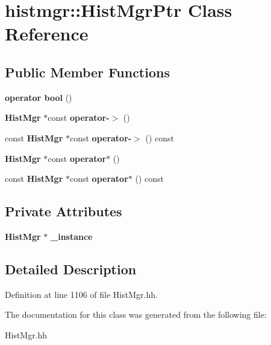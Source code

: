 \section{histmgr\-:\-:Hist\-Mgr\-Ptr Class Reference}
\label{classhistmgr_1_1HistMgrPtr}
\subsection*{Public Member Functions}
\begin{DoxyCompactItemize}
\item 
{\bfseries operator bool} ()\label{classhistmgr_1_1HistMgrPtr_acf2158fc8e0f347d006fc31f1a33bf52}

\item 
{\bf Hist\-Mgr} $\ast$const {\bfseries operator-\/$>$} ()\label{classhistmgr_1_1HistMgrPtr_a09dd0e1b7852437c12f7fe251ff713dc}

\item 
const {\bf Hist\-Mgr} $\ast$const {\bfseries operator-\/$>$} () const \label{classhistmgr_1_1HistMgrPtr_ac497929db7588d7629cd2c3bf7e9744c}

\item 
{\bf Hist\-Mgr} $\ast$const {\bfseries operator$\ast$} ()\label{classhistmgr_1_1HistMgrPtr_a074898ab82b8aea3c938331ffd635939}

\item 
const {\bf Hist\-Mgr} $\ast$const {\bfseries operator$\ast$} () const \label{classhistmgr_1_1HistMgrPtr_ad0f7b4a29768b1773ec06230b848a02a}

\end{DoxyCompactItemize}
\subsection*{Private Attributes}
\begin{DoxyCompactItemize}
\item 
{\bf Hist\-Mgr} $\ast$ {\bfseries \-\_\-instance}\label{classhistmgr_1_1HistMgrPtr_a7ef0be62561702faa6a28628f008b9fe}

\end{DoxyCompactItemize}


\subsection{Detailed Description}


Definition at line 1106 of file Hist\-Mgr.\-hh.



The documentation for this class was generated from the following file\-:\begin{DoxyCompactItemize}
\item 
Hist\-Mgr.\-hh\end{DoxyCompactItemize}
